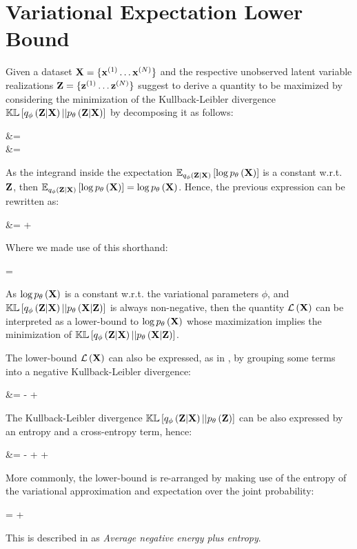 \section{Variational Expectation Lower Bound}
\label{elbo}

Given a 
dataset $\mathbf{X} = \{{\mathbf{x}^{(1)}} \ldots {\mathbf{x}^{(N)}} \}$
and the respective unobserved latent variable realizations
$\mathbf{Z} = \{{\mathbf{z}^{(1)}} \ldots {\mathbf{z}^{(N)}}\}$
\cite{Fox2012}
suggest to derive a quantity to be maximized by considering the minimization
of the Kullback-Leibler divergence $\mathbb{KL}\left[ q_\phi\left(\mathbf{Z}|\mathbf{X}\right) || p_\theta\left(\mathbf{Z}|\mathbf{X}\right) \right]$ by decomposing it as follows:

\begin{nalign}
\kl{\qphiZ}{\pZcond} &=
\expectqphiZ{\log \frac{\qphiZ}{\pZcond}}\\
&= \expectqphiZ{\log \qphiZ - \log \pXcond - \log \pZ + \log \pX}
\end{nalign}

As the integrand inside the expectation $\mathbb{E}_{q_\phi\left(\mathbf{Z}|\mathbf{X}\right)}\left[ \log p_\theta\left(\mathbf{X}\right) \right]$ 
is a constant w.r.t. $\mathbf{Z}$, then $\mathbb{E}_{q_\phi\left(\mathbf{Z}|\mathbf{X}\right)}\left[ \log p_\theta\left(\mathbf{X}\right) \right]=\log p_\theta\left(\mathbf{X}\right)$. Hence, the
previous expression can be rewritten as:

\begin{nalign}
\log \pX &= \kl{\qphiZ}{\pZcond}
+ \elboX
\end{nalign}

Where we made use of this shorthand:
\begin{nalign}
    \elboX = \expectqphiZ{-\log \qphiZ + \log \pXcond + \log \pZ}
\end{nalign}

As $\log p_\theta\left(\mathbf{X}\right)$ is a constant w.r.t. the variational parameters $\phi$,
and $\mathbb{KL}\left[ q_\phi\left(\mathbf{Z}|\mathbf{X}\right) || p_\theta\left(\mathbf{X}|\mathbf{Z}\right) \right]$ is always non-negative,
then the quantity $\mathcal{L}\left(\mathbf{X}\right)$ can be interpreted as a lower-bound to $\log p_\theta\left(\mathbf{X}\right)$
whose maximization implies the minimization of $\mathbb{KL}\left[ q_\phi\left(\mathbf{Z}|\mathbf{X}\right) || p_\theta\left(\mathbf{X}|\mathbf{Z}\right) \right]$.

The lower-bound $\mathcal{L}\left(\mathbf{X}\right)$ can also be expressed, as in \cite{1312.6114},
by grouping some terms
into a negative Kullback-Leibler divergence:
\begin{nalign}
\elboX 
&= -\kl{\qphiZ}{\pZ} + \expectqphiZ{\log \pXcond}
\end{nalign}

The Kullback-Leibler divergence $\mathbb{KL}\left[ q_\phi\left(\mathbf{Z}|\mathbf{X}\right) || p_\theta\left(\mathbf{Z}\right) \right]$ can be also expressed by 
an entropy and a cross-entropy term, hence:

\begin{nalign}\label{elbo_crossentropy}
\elboX 
&= -\entropy{\qphiZ,\pZ} + \entropy{\qphiZ} + \expectqphiZ{\log \pXcond}
\end{nalign}

More commonly, the lower-bound is re-arranged by making use of
the entropy of the variational approximation
and expectation over the joint probability:

\begin{nalign}
\elboX = \entropy{\qphiZ} + \expectqphiZ{\log \pXZ}
\end{nalign}

This is described in \cite{surgery} as \emph{Average negative energy plus entropy}.

